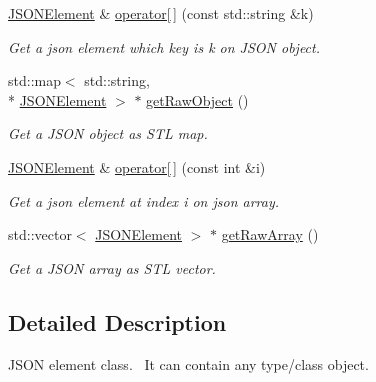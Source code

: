 \begin{DoxyCompactItemize}
\item 
\hyperlink{class_simple_j_s_o_n_1_1_j_s_o_n_element}{J\+S\+O\+N\+Element} \& \hyperlink{class_simple_j_s_o_n_1_1_j_s_o_n_element_a0d228460082d135125effef76fd83d32}{operator\mbox{[}$\,$\mbox{]}} (const std\+::string \&k)
\begin{DoxyCompactList}\small\item\em Get a json element which key is k on J\+S\+O\+N object. \end{DoxyCompactList}\item 
std\+::map$<$ std\+::string, \\*
\hyperlink{class_simple_j_s_o_n_1_1_j_s_o_n_element}{J\+S\+O\+N\+Element} $>$ $\ast$ \hyperlink{class_simple_j_s_o_n_1_1_j_s_o_n_element_a42a30b2bf840d0be2bede6ae1c4e8747}{get\+Raw\+Object} ()
\begin{DoxyCompactList}\small\item\em Get a J\+S\+O\+N object as S\+T\+L map. \end{DoxyCompactList}\item 
\hyperlink{class_simple_j_s_o_n_1_1_j_s_o_n_element}{J\+S\+O\+N\+Element} \& \hyperlink{class_simple_j_s_o_n_1_1_j_s_o_n_element_a57970ea8a02b1c561f1f25935abb7724}{operator\mbox{[}$\,$\mbox{]}} (const int \&i)
\begin{DoxyCompactList}\small\item\em Get a json element at index i on json array. \end{DoxyCompactList}\item 
std\+::vector$<$ \hyperlink{class_simple_j_s_o_n_1_1_j_s_o_n_element}{J\+S\+O\+N\+Element} $>$ $\ast$ \hyperlink{class_simple_j_s_o_n_1_1_j_s_o_n_element_a6545f7509c12060ea091d9112e9b2af8}{get\+Raw\+Array} ()
\begin{DoxyCompactList}\small\item\em Get a J\+S\+O\+N array as S\+T\+L vector. \end{DoxyCompactList}\end{DoxyCompactItemize}


\subsection{Detailed Description}
J\+S\+O\+N element class.~\newline
 It can contain any type/class object. 

